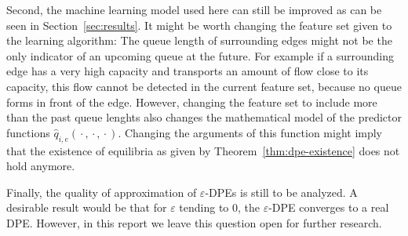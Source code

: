 \documentclass[titlepage]{scrartcl}
\theoremstyle{definition}
\newcommand{\emptyArg}{\,\boldsymbol{\cdot}\,}
\newcommand{\predq}{\hat q}
\begin{document}
    Second, the machine learning model used here can still be improved as can be seen in Section~\ref{sec:results}.
    It might be worth changing the feature set given to the learning algorithm:
    The queue length of surrounding edges might not be the only indicator of an upcoming queue at the future.
    For example if a surrounding edge has a very high capacity and transports an amount of flow close to its capacity, this flow cannot be detected in the current feature set, because no queue forms in front of the edge. 
    However, changing the feature set to include more than the past queue lenghts also changes the mathematical model of the predictor functions $\predq_{i,e}(\emptyArg, \emptyArg, \emptyArg)$.
    Changing the arguments of this function might imply that the existence of equilibria as given by Theorem~\ref{thm:dpe-existence} does not hold anymore.
    
    Finally, the quality of approximation of $\varepsilon$-DPEs is still to be analyzed.
    A desirable result would be that for $\varepsilon$ tending to $0$, the $\varepsilon$-DPE converges to a real DPE.
    However, in this report we leave this question open for further research.

    \clearpage
    \printbibliography
\end{document}
